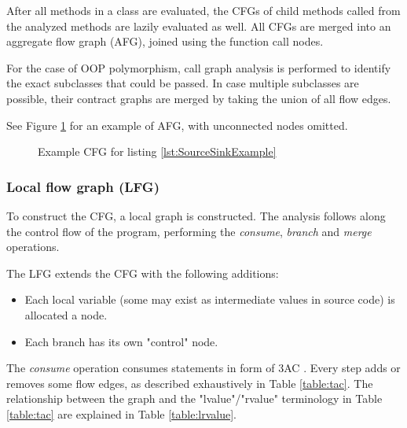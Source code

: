 After all methods in a class are evaluated,
the CFGs of child methods called from the analyzed methods
are lazily evaluated as well.
All CFGs are merged into an aggregate flow graph (AFG),
joined using the function call nodes.

For the case of OOP polymorphism,
call graph analysis is performed to identify
the exact subclasses that could be passed.
In case multiple subclasses are possible,
their contract graphs are merged by taking the union of all flow edges.

See Figure \ref{fig:SourceSinkContract} for an example of AFG,
with unconnected nodes omitted.

\begin{figure}
	\caption{Example CFG for listing \ref{lst:SourceSinkExample}}
	\begin{center}
	\end{center}
	\label{fig:SourceSinkContract}
\end{figure}

\subsubsection{Local flow graph (LFG)}
To construct the CFG,
a local graph is constructed.
The analysis follows along the control flow of the program,
performing the \emph{consume}, \emph{branch} and \emph{merge} operations.

The LFG extends the CFG with the following additions:
\begin{itemize}
	\item Each local variable (some may exist as intermediate values in source code)
		is allocated a node.
	\item Each branch has its own "control" node.
\end{itemize}

The \emph{consume} operation consumes statements in form of 3AC \cite{sootsurvivor}.
Every step adds or removes some flow edges,
as described exhaustively in Table \ref{table:tac}.
The relationship between the graph and the "lvalue"/"rvalue" terminology
in Table \ref{table:tac} are explained in Table \ref{table:lrvalue}.

